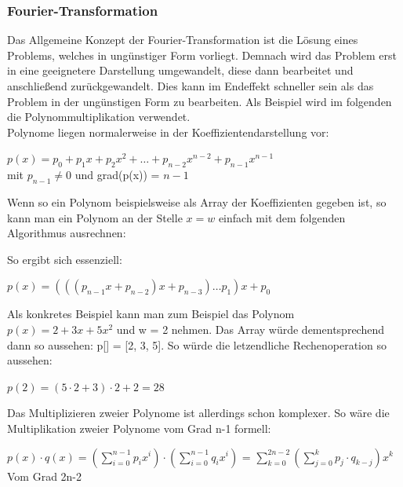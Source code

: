 \documentclass[
../AuD-Zusammenfassung.tex,
]
{subfiles}
\begin{document}
\subsubsection{Fourier-Transformation}
Das Allgemeine Konzept der Fourier-Transformation ist die Lösung eines Problems, welches in ungünstiger Form vorliegt. Demnach wird das Problem erst in eine geeignetere Darstellung umgewandelt, diese dann bearbeitet und anschließend zurückgewandelt. Dies kann im Endeffekt schneller sein als das Problem in der ungünstigen Form zu bearbeiten. Als Beispiel wird im folgenden die Polynommultiplikation verwendet.\\
Polynome liegen normalerweise in der Koeffizientendarstellung vor:
\begin{center}
    $p(x) = p_0 + p_1x + p_2x^2 + \ldots + p_{n-2}x^{n-2} + p_{n-1}x^{n-1}$\\
    mit $p_{n-1} \not= 0$ und grad(p(x)) = $n - 1$
\end{center}
Wenn so ein Polynom beispielsweise als Array der Koeffizienten gegeben ist, so kann man ein Polynom an der Stelle $x = w$ einfach mit dem folgenden Algorithmus ausrechnen:\\
\begin{algorithm}[H]
\end{algorithm}
So ergibt sich essenziell:
\begin{center}
    $p(x) = (((p_{n-1}x + p_{n-2})x + p_{n-3})\ldots p_1)x + p_0$
\end{center}
Als konkretes Beispiel kann man zum Beispiel das Polynom $p(x) = 2 + 3x + 5x^2$ und w = 2 nehmen. Das Array würde dementsprechend dann so aussehen: p[] = [2, 3, 5].
So würde die letzendliche Rechenoperation so aussehen:
\begin{center}
    $p(2) = (5 \cdot 2 + 3) \cdot 2 + 2 = 28$ 
\end{center}
\newpage
Das Multiplizieren zweier Polynome ist allerdings schon komplexer. So wäre die Multiplikation zweier Polynome vom Grad n-1 formell: 
\begin{center}
    $p(x) \cdot q(x) = (\sum_{i=0}^{n-1}p_ix^i) \cdot (\sum_{i=0}^{n-1}q_ix^i)$ = $\sum_{k=0}^{2n-2}(\sum_{j=0}^{k}p_j\cdot q_{k-j})x^k$\\
    Vom Grad 2n-2
\end{center}
\end{document}
